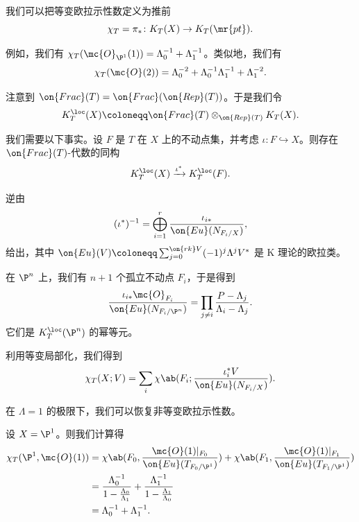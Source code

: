 \begin{defn}
    我们可以把等变欧拉示性数定义为推前
    \[ \chi_T = \pi_* \colon K_T(X) \to K_T(\mr{pt}). \]
\end{defn}

\begin{exm}
    例如，我们有 \(\chi_T(\mc{O}_{\P^1}(1)) = \Lambda_0^{-1} + \Lambda_1^{-1}\)。类似地，我们有
    \[ \chi_T(\mc{O}(2)) = \Lambda_0^{-2} + \Lambda_0^{-1} \Lambda_1^{-1} + \Lambda_1^{-2}. \]
\end{exm}

\begin{notn}
    注意到 \(\on{Frac}(T) = \on{Frac}(\on{Rep}(T))\)。于是我们令
    \[ K_T^{\loc}(X) \coloneqq \on{Frac}(T) \otimes_{\on{Rep}(T)} K_T(X). \]
\end{notn}

我们需要以下事实。设 \(F\) 是 \(T\) 在 \(X\) 上的不动点集，并考虑 \(\iota \colon F \hookrightarrow X\)。则存在 \(\on{Frac}(T)\)-代数的同构
\[ K_T^{\loc}(X) \xrightarrow{\iota^*} K_T^{\loc}(F). \]

\begin{rmk}
    逆由
    \[ (\iota^*)^{-1} = \bigoplus_{i=1}^r \frac{\iota_{i*}}{\on{Eu}(N_{F_i/X})}, \]
    给出，其中 \(\on{Eu}(V) \coloneqq \sum_{j = 0}^{\on{rk} V} (-1)^j \Lambda^j V^*\) 是 K 理论的欧拉类。
\end{rmk}

\begin{exm}
    在 \(\P^n\) 上，我们有 \(n+1\) 个孤立不动点 \(F_i\)，于是得到
    \[ \frac{\iota_{i*} \mc{O}_{F_i}}{\on{Eu}(N_{F_i/\P^n})} = \prod_{j \neq i} \frac{P - \Lambda_j}{\Lambda_i - \Lambda_j}. \]
    它们是 \(K_T^{\loc}(\P^n)\) 的幂等元。
\end{exm}

利用等变局部化，我们得到
\[ \chi_T(X; V) = \sum_i \chi\ab(F_i; \frac{\iota_i^* V}{\on{Eu}(N_{F_i/X})}). \]

\begin{rmk}
    在 \(\Lambda = 1\) 的极限下，我们可以恢复非等变欧拉示性数。
\end{rmk}

\begin{exm}
    设 \(X = \P^1\)。则我们计算得
    \begin{align*}
        \chi_T(\P^1, \mc{O}(1)) &= \chi\ab(F_0, \frac{\mc{O}(1)|_{F_0}}{\on{Eu}(T_{F_0/\P^1})}) + \chi\ab(F_1, \frac{\mc{O}(1)|_{F_1}}{\on{Eu}(T_{F_1/\P^1})}) \\
        &= \frac{\Lambda_0^{-1}}{1 - \frac{\Lambda_0}{\Lambda_1}} + \frac{\Lambda_1^{-1}}{1 - \frac{\Lambda_1}{\Lambda_0}} \\
        &= \Lambda_0^{-1} + \Lambda_1^{-1}. 
    \end{align*}
\end{exm}

